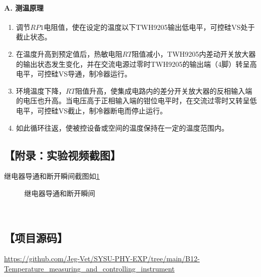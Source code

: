 \documentclass[12pt,a4paper,UTF8]{ctexart}
\begin{document}
    \paragraph{A. 测温原理}
    \begin{enumerate}[label=\arabic*.]
        \item 调节$RP1$电阻值，使在设定的温度以下TWH9205输出低电平，可控硅VS处于截止状态。
        \item 在温度升高到预定值后，热敏电阻$RT$阻值减小，TWH9205内差动开关放大器的输出状态发生变化，并在交流电源过零时TWH9205的输出端（4脚）转呈高电平，可控硅VS导通，制冷器运行。
        \item 环境温度下降，$RT$阻值升高，使集成电路内的差分开关放大器的反相输入端的电压也升高。当电压高于正相输入端的钳位电平时，在交流过零时又转呈低电平，可控硅VS截止，制冷器断电而停止运行。
        \item 如此循环往返，使被控设备或空间的温度保持在一定的温度范围内。
    \end{enumerate}

\subsection*{【附录：实验视频截图】}
继电器导通和断开瞬间截图如\ref{fig:2}
\begin{figure}[htbp]
    \centering



    \caption{继电器导通和断开瞬间}
    \label{fig:2}
\end{figure}
　　
\subsection*{【项目源码】}
\url{https://github.com/Jeg-Vet/SYSU-PHY-EXP/tree/main/B12-Temperature_measuring_and_controlling_instrument}
		
\end{document}
